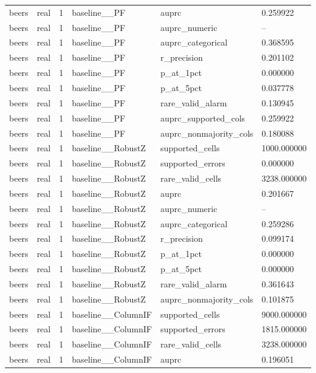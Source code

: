\begin{tabular}{llllll}
beers & real & 1 & baseline\_\_PF & auprc & 0.259922 \\
beers & real & 1 & baseline\_\_PF & auprc\_numeric & -- \\
beers & real & 1 & baseline\_\_PF & auprc\_categorical & 0.368595 \\
beers & real & 1 & baseline\_\_PF & r\_precision & 0.201102 \\
beers & real & 1 & baseline\_\_PF & p\_at\_1pct & 0.000000 \\
beers & real & 1 & baseline\_\_PF & p\_at\_5pct & 0.037778 \\
beers & real & 1 & baseline\_\_PF & rare\_valid\_alarm & 0.130945 \\
beers & real & 1 & baseline\_\_PF & auprc\_supported\_cols & 0.259922 \\
beers & real & 1 & baseline\_\_PF & auprc\_nonmajority\_cols & 0.180088 \\
beers & real & 1 & baseline\_\_RobustZ & supported\_cells & 1000.000000 \\
beers & real & 1 & baseline\_\_RobustZ & supported\_errors & 0.000000 \\
beers & real & 1 & baseline\_\_RobustZ & rare\_valid\_cells & 3238.000000 \\
beers & real & 1 & baseline\_\_RobustZ & auprc & 0.201667 \\
beers & real & 1 & baseline\_\_RobustZ & auprc\_numeric & -- \\
beers & real & 1 & baseline\_\_RobustZ & auprc\_categorical & 0.259286 \\
beers & real & 1 & baseline\_\_RobustZ & r\_precision & 0.099174 \\
beers & real & 1 & baseline\_\_RobustZ & p\_at\_1pct & 0.000000 \\
beers & real & 1 & baseline\_\_RobustZ & p\_at\_5pct & 0.000000 \\
beers & real & 1 & baseline\_\_RobustZ & rare\_valid\_alarm & 0.361643 \\
beers & real & 1 & baseline\_\_RobustZ & auprc\_nonmajority\_cols & 0.101875 \\
beers & real & 1 & baseline\_\_ColumnIF & supported\_cells & 9000.000000 \\
beers & real & 1 & baseline\_\_ColumnIF & supported\_errors & 1815.000000 \\
beers & real & 1 & baseline\_\_ColumnIF & rare\_valid\_cells & 3238.000000 \\
beers & real & 1 & baseline\_\_ColumnIF & auprc & 0.196051 \\

\end{tabular}
